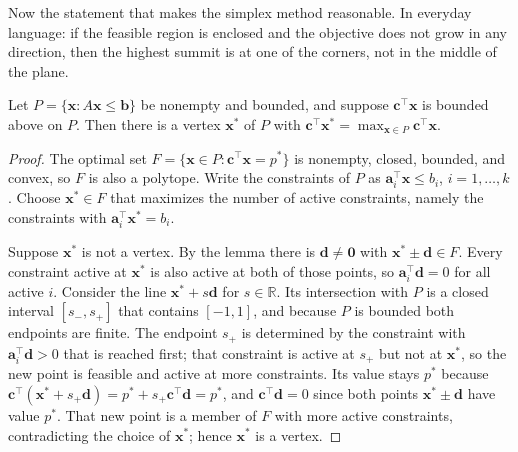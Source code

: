 Now the statement that makes the simplex method reasonable. In everyday language: if the
feasible region is enclosed and the objective does not grow in any direction, then the highest
summit is at one of the corners, not in the middle of the plane.

\begin{teorema}
Let $P=\{\mathbf{x}:A\mathbf{x}\le\mathbf{b}\}$ be nonempty and bounded, and suppose
$\mathbf{c}^{\top}\mathbf{x}$ is bounded above on $P$. Then there is a vertex
$\mathbf{x}^{*}$ of $P$ with $\mathbf{c}^{\top}\mathbf{x}^{*}
=\max_{\mathbf{x}\in P}\mathbf{c}^{\top}\mathbf{x}$.
\end{teorema}

\begin{proof}
The optimal set $F=\{\mathbf{x}\in P:\mathbf{c}^{\top}\mathbf{x}=p^{*}\}$ is nonempty, closed,
bounded, and convex, so $F$ is also a polytope. Write the constraints of $P$ as
$\mathbf{a}_{i}^{\top}\mathbf{x}\le b_{i}$, $i=1,\dots,k$. Choose $\mathbf{x}^{*}\in F$
that maximizes the number of active constraints, namely the constraints with
$\mathbf{a}_{i}^{\top}\mathbf{x}^{*}=b_{i}$.

Suppose $\mathbf{x}^{*}$ is not a vertex. By the lemma there is $\mathbf{d}\ne\mathbf{0}$
with $\mathbf{x}^{*}\pm\mathbf{d}\in F$. Every constraint active at
$\mathbf{x}^{*}$ is also active at both of those points, so
$\mathbf{a}_{i}^{\top}\mathbf{d}=0$ for all active $i$. Consider the line
$\mathbf{x}^{*}+s\mathbf{d}$ for $s\in\mathbb{R}$. Its intersection with $P$ is a closed
interval $[s_{-},s_{+}]$ that contains $[-1,1]$, and because $P$ is bounded both endpoints are
finite. The endpoint $s_{+}$ is determined by the constraint with $\mathbf{a}_{i}^{\top}\mathbf{d}>0$
that is reached first; that constraint is active at $s_{+}$ but not at $\mathbf{x}^{*}$, so the
new point is feasible and active at more constraints. Its value stays $p^{*}$ because
$\mathbf{c}^{\top}(\mathbf{x}^{*}+s_{+}\mathbf{d})=p^{*}+s_{+}\mathbf{c}^{\top}
\mathbf{d}=p^{*}$, and $\mathbf{c}^{\top}\mathbf{d}=0$ since both points
$\mathbf{x}^{*}\pm\mathbf{d}$ have value $p^{*}$. That new point is a member of $F$ with more
active constraints, contradicting the choice of $\mathbf{x}^{*}$; hence $\mathbf{x}^{*}$ is a
vertex.
\end{proof}

